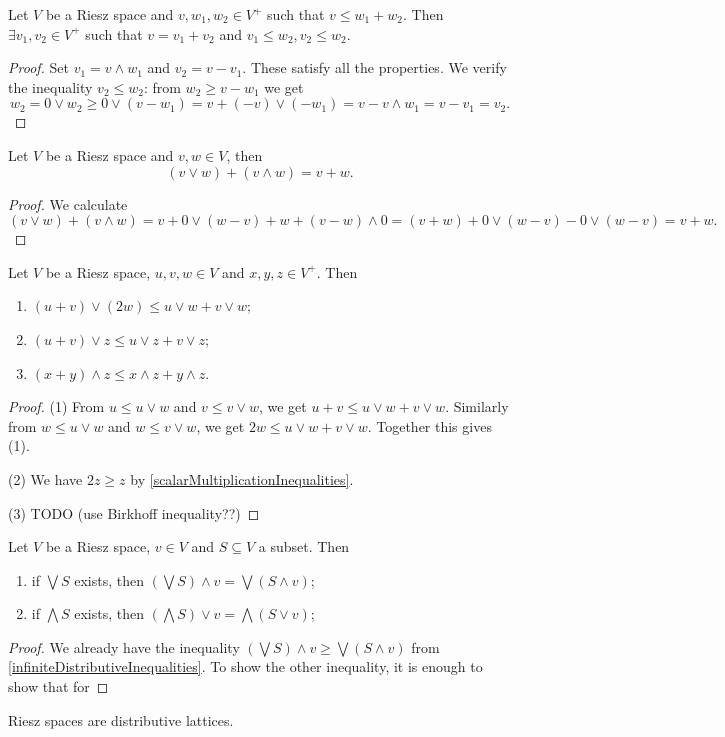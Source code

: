 \begin{proposition}
Let $V$ be a Riesz space and $v,w_1,w_2\in V^+$ such that $v \leq w_1 + w_2$. Then $\exists v_1, v_2\in V^+$ such that $v = v_1 + v_2$ and $v_1 \leq w_2, v_2 \leq w_2$.
\end{proposition}
\begin{proof}
Set $v_1 = v\wedge w_1$ and $v_2 = v - v_1$. These satisfy all the properties. We verify the inequality $v_2 \leq w_2$: from $w_2 \geq v - w_1$ we get
\[ w_2 = 0\vee w_2 \geq 0\vee (v - w_1) = v + (-v)\vee(-w_1) = v - v\wedge w_1 = v-v_1 = v_2. \]
\end{proof}

\begin{proposition} \label{sumAsMeetJoin}
Let $V$ be a Riesz space and $v,w\in V$, then
\[ (v \vee w) + (v \wedge w) = v+w. \]
\end{proposition}
\begin{proof}
We calculate
\[ (v \vee w) + (v \wedge w) = v + 0 \vee (w-v) + w + (v-w)\wedge 0 = (v + w) + 0 \vee (w-v) - 0 \vee (w-v) = v + w. \]
\end{proof}

\begin{proposition}
Let $V$ be a Riesz space, $u,v,w\in V$ and $x,y,z\in V^+$. Then
\begin{enumerate}
\item $(u+v)\vee (2w) \leq u\vee w + v\vee w$;
\item $(u+v)\vee z \leq u\vee z + v\vee z$;
\item $(x+y)\wedge z \leq x\wedge z + y\wedge z$.
\end{enumerate}
\end{proposition}
\begin{proof}
(1) From $u\leq u\vee w$ and $v\leq v\vee w$, we get $u+v \leq u\vee w + v\vee w$. Similarly from $w\leq u\vee w$ and $w\leq v\vee w$, we get $2w \leq u\vee w + v\vee w$. Together this gives (1).

(2) We have $2z \geq z$ by \ref{scalarMultiplicationInequalities}.

(3) TODO (use Birkhoff inequality??)
\end{proof}

\begin{proposition}
Let $V$ be a Riesz space, $v\in V$ and $S\subseteq V$ a subset. Then
\begin{enumerate}
\item if $\bigvee S$ exists, then $\left(\bigvee S\right) \wedge v = \bigvee (S\wedge v)$;
\item if $\bigwedge S$ exists, then $\left(\bigwedge S\right) \vee v = \bigwedge (S\vee v)$;
\end{enumerate}
\end{proposition}
\begin{proof}
We already have the inequality $\left(\bigvee S\right) \wedge v \geq \bigvee (S\wedge v)$ from \ref{infiniteDistributiveInequalities}. To show the other inequality, it is enough to show that for 
\end{proof}
\begin{corollary}
Riesz spaces are distributive lattices.
\end{corollary}

